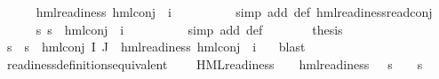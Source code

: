 \begin{isabellebody}
\ \ \ \ \isamarkupfalse%
\ {\isachardoublequoteopen}hml{\isacharunderscore}{\kern0pt}readiness\ {\isacharparenleft}{\kern0pt}hml{\isacharunderscore}{\kern0pt}conj\ {\isacharbraceleft}{\kern0pt}{\isacharbraceright}{\kern0pt}\ {\isacharbraceleft}{\kern0pt}i{\isacharunderscore}{\kern0pt}{\isasymphi}{\isacharbraceright}{\kern0pt}\ {\isasymPsi}{\isacharparenright}{\kern0pt}{\isachardoublequoteclose}\ \isanewline
\ \ \ \ \ \ \isamarkupfalse%
\ {\isacharparenleft}{\kern0pt}simp\ add{\isacharcolon}{\kern0pt}\ {\isasymPsi}{\isacharunderscore}{\kern0pt}def\ hml{\isacharunderscore}{\kern0pt}readiness{\isachardot}{\kern0pt}read{\isacharunderscore}{\kern0pt}conj{\isacharparenright}{\kern0pt}\isanewline
\ \ \ \ \isamarkupfalse%
\ {\isachardoublequoteopen}{\isasymforall}s{\isachardot}{\kern0pt}\ {\isasymnot}s\ {\isasymTurnstile}\ {\isacharparenleft}{\kern0pt}hml{\isacharunderscore}{\kern0pt}conj\ {\isacharbraceleft}{\kern0pt}{\isacharbraceright}{\kern0pt}\ {\isacharbraceleft}{\kern0pt}i{\isacharunderscore}{\kern0pt}{\isasymphi}{\isacharbraceright}{\kern0pt}\ {\isasymPsi}{\isacharparenright}{\kern0pt}{\isachardoublequoteclose}\ \isanewline
\ \ \ \ \ \ \isamarkupfalse%
\ {\isacharparenleft}{\kern0pt}simp\ add{\isacharcolon}{\kern0pt}\ {\isasymPsi}{\isacharunderscore}{\kern0pt}def{\isacharparenright}{\kern0pt}\isanewline
\ \ \ \ \isamarkupfalse%
\ \isamarkupfalse%
\ {\isacharquery}{\kern0pt}thesis\ \isanewline
\ \ \ \ \ \ \isamarkupfalse%
\ {\isacartoucheopen}{\isasymforall}s{\isachardot}{\kern0pt}\ {\isasymnot}\ s\ {\isasymTurnstile}\ hml{\isacharunderscore}{\kern0pt}conj\ I\ J\ {\isasymPhi}{\isacartoucheclose}\ {\isacartoucheopen}hml{\isacharunderscore}{\kern0pt}readiness\ {\isacharparenleft}{\kern0pt}hml{\isacharunderscore}{\kern0pt}conj\ {\isacharbraceleft}{\kern0pt}{\isacharbraceright}{\kern0pt}\ {\isacharbraceleft}{\kern0pt}i{\isacharunderscore}{\kern0pt}{\isasymphi}{\isacharbraceright}{\kern0pt}\ {\isasymPsi}{\isacharparenright}{\kern0pt}{\isacartoucheclose}\ \isamarkupfalse%
\ blast\isanewline
\ \ \isamarkupfalse%
\isanewline
{}\isamarkupfalse%
%
\endisatagproof
{\isafoldproof}%
%
\isadelimproof
\isanewline
%
\endisadelimproof
\isanewline
{}\isamarkupfalse%
\ readiness{\isacharunderscore}{\kern0pt}definitions{\isacharunderscore}{\kern0pt}equivalent{\isacharcolon}{\kern0pt}\ \isanewline
\ \ {\isachardoublequoteopen}{\isasymforall}{\isasymphi}{\isachardot}{\kern0pt}\ {\isacharparenleft}{\kern0pt}HML{\isacharunderscore}{\kern0pt}readiness\ {\isasymphi}\ {\isasymlongrightarrow}\ {\isacharparenleft}{\kern0pt}{\isasymexists}{\isasympsi}{\isachardot}{\kern0pt}\ hml{\isacharunderscore}{\kern0pt}readiness\ {\isasympsi}\ {\isasymand}\ {\isacharparenleft}{\kern0pt}s\ {\isasymTurnstile}\ {\isasympsi}\ {\isasymlongleftrightarrow}\ s\ {\isasymTurnstile}\ {\isasymphi}{\isacharparenright}{\kern0pt}{\isacharparenright}{\kern0pt}{\isacharparenright}{\kern0pt}{\isachardoublequoteclose}\isanewline

\end{isabellebody}
